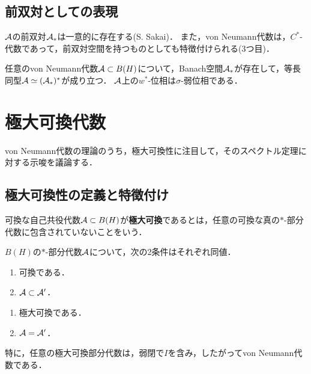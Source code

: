 \documentclass[uplatex,dvipdfmx]{jsreport}
\begin{document}
\subsection{前双対としての表現}

\begin{tcolorbox}[colframe=ForestGreen, colback=ForestGreen!10!white,breakable,colbacktitle=ForestGreen!40!white,coltitle=black,fonttitle=\bfseries\sffamily,
title=]
    $\mathcal{A}$の前双対$\mathcal{A}_*$は一意的に存在する(S. Sakai)．
    また，von Neumann代数は，$C^*$-代数であって，前双対空間を持つものとしても特徴付けられる(3つ目)．
\end{tcolorbox}

\begin{theorem}
    任意のvon Neumann代数$\mathcal{A}\subset B(H)$について，Banach空間$\mathcal{A}_*$が存在して，等長同型$\mathcal{A}\simeq(\mathcal{A}_*)^*$が成り立つ．
    $\mathcal{A}$上の$w^*$-位相は$\sigma$-弱位相である．
\end{theorem}

\section{極大可換代数}

\begin{tcolorbox}[colframe=ForestGreen, colback=ForestGreen!10!white,breakable,colbacktitle=ForestGreen!40!white,coltitle=black,fonttitle=\bfseries\sffamily,
title=]
    von Neumann代数の理論のうち，極大可換性に注目して，そのスペクトル定理に対する示唆を議論する．
\end{tcolorbox}

\subsection{極大可換性の定義と特徴付け}

\begin{definition}
    可換な自己共役代数$\mathcal{A}\subset B(H)$が\textbf{極大可換}であるとは，任意の可換な真の$*$-部分代数に包含されていないことをいう．
\end{definition}
\begin{lemma}
    $B(H)$の$*$-部分代数$\mathcal{A}$について，次の2条件はそれぞれ同値．
    \begin{enumerate}
        \item 可換である．
        \item $\mathcal{A}\subset\mathcal{A}'$．
    \end{enumerate}
    \begin{enumerate}
        \item 極大可換である．
        \item $\mathcal{A}=\mathcal{A}'$．
    \end{enumerate}
    特に，任意の極大可換部分代数は，弱閉で$I$を含み，したがってvon Neumann代数である．
\end{lemma}
\end{document}
